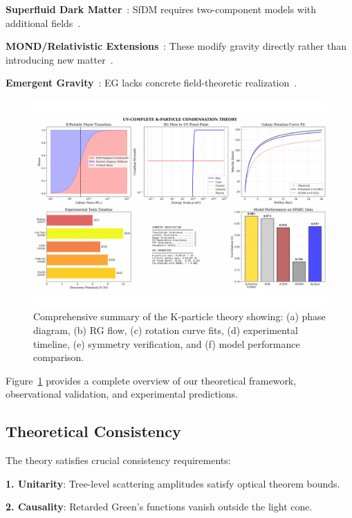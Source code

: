 \documentclass[aps,prd,twocolumn,showpacs,superscriptaddress,groupedaddress,nofootinbib]{revtex4-2}
\begin{document}
\textbf{Superfluid Dark Matter}~\cite{Berezhiani2016,Khoury2021}: SfDM requires two-component models with additional fields~\cite{Mistele2023,Garani2023}.

\textbf{MOND/Relativistic Extensions}~\cite{Milgrom1983,Bekenstein2004}: These modify gravity directly rather than introducing new matter~\cite{Skordis2021,Duffy2023}.

\textbf{Emergent Gravity}~\cite{Verlinde2017,Cai2020}: EG lacks concrete field-theoretic realization~\cite{Pardo2020,Tamosiunas2023}.


\begin{figure}[htbp]
\centering
\includegraphics[width=0.9\columnwidth]{summary_figure.pdf}
\caption{Comprehensive summary of the K-particle theory showing: (a) phase diagram, (b) RG flow, (c) rotation curve fits, (d) experimental timeline, (e) symmetry verification, and (f) model performance comparison.}
\label{fig:summary}
\end{figure}

Figure~\ref{fig:summary} provides a complete overview of our theoretical framework, observational validation, and experimental predictions.

\subsection{Theoretical Consistency}

The theory satisfies crucial consistency requirements:

\textbf{1. Unitarity}: Tree-level scattering amplitudes satisfy optical theorem bounds.

\textbf{2. Causality}: Retarded Green's functions vanish outside the light cone.
\end{document}
